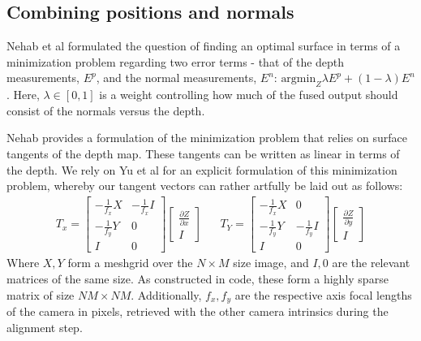 \documentclass[final]{cvpr}
\begin{document}
	
\subsection{Combining positions and normals}
	Nehab et al formulated the question of finding an optimal surface in terms of a minimization problem regarding two error terms - that of the depth measurements, $E^p$, and the normal measurements, $E^n$: $\text{argmin}_{Z} \lambda E^p + (1 - \lambda) E^n$. Here, $\lambda \in [0, 1]$ is a weight controlling how much of the fused output should consist of the normals versus the depth.
	
	Nehab provides a formulation of the minimization problem that relies on surface tangents of the depth map. These tangents can be written as linear in terms of the depth. We rely on Yu et al \cite{InverseRenderingYuSmithNehabMethod} for an explicit formulation of this minimization problem, whereby our tangent vectors can rather artfully be laid out as follows:
	\begin{align*}
		T_x = \begin{bmatrix}-\frac{1}{f_x}X & -\frac{1}{f_x}I\\-\frac{1}{f_y}Y & 0\\
		I & 0\end{bmatrix}\begin{bmatrix}\frac{\partial Z}{\partial x}\\
		I\end{bmatrix}	&  & T_Y = \begin{bmatrix}-\frac{1}{f_x}X & 0\\-\frac{1}{f_y}Y & -\frac{1}{f_y}I\\
		I & 0\end{bmatrix}\begin{bmatrix}\frac{\partial Z}{\partial y}\\
		I\end{bmatrix}
	\end{align*}
	Where $X, Y$ form a meshgrid over the $N \times M$ size image, and $I, 0$ are the relevant matrices of the same size. As constructed in code, these form a highly sparse matrix of size $NM \times NM$. Additionally, $f_x, f_y$ are the respective axis focal lengths of the camera in pixels, retrieved with the other camera intrinsics during the alignment step. 
	
\end{document}

